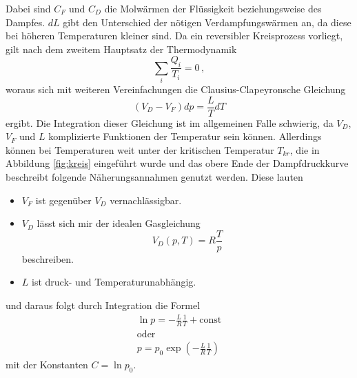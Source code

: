 Dabei sind $C_F$ und $C_D$ die Molwärmen der Flüssigkeit beziehungsweise des Dampfes. 
$dL$ gibt den Unterschied der nötigen Verdampfungswärmen an, da diese bei höheren Temperaturen kleiner sind. Da ein reversibler Kreisprozess vorliegt, gilt nach dem zweitem Hauptsatz
der Thermodynamik 
\begin{equation}
    \sum_i \frac{Q_i}{T_i} = 0 \, ,
\end{equation}
woraus sich mit weiteren Vereinfachungen die Clausius-Clapeyronsche Gleichung
\begin{equation}
    (V_D-V_F)dp = \frac{L}{T}dT
\end{equation}
ergibt. Die Integration dieser Gleichung ist im allgemeinen Falle schwierig, da $V_D$, $V_F$ und $L$ komplizierte Funktionen der Temperatur sein können.
Allerdings können bei Temperaturen weit unter der kritischen Temperatur $T_{kr}$, die in Abbildung \ref{fig:kreis} eingeführt wurde und das obere Ende der Dampfdruckkurve beschreibt
folgende Näherungsannahmen genutzt werden. Diese lauten
\begin{itemize}
    \item $V_F$ ist gegenüber $V_D$ vernachlässigbar.
    \item $V_D$ lässt sich mir der idealen Gasgleichung
        \begin{equation}
            V_D(p,T) =R \frac{T}{p}
        \end{equation}
        beschreiben.
    \item $L$ ist druck- und Temperaturunabhängig.
\end{itemize}
und daraus folgt durch Integration die Formel
\begin{gather}
    \ln p = - \frac{L}{R} \frac{1}{T} + \text{const} \\
    \text{oder} \\
    p= p_0 \exp \left(- \frac{L}{R} \frac{1}{T}\right)
\end{gather}
mit der Konstanten $C= \ln p_0$.